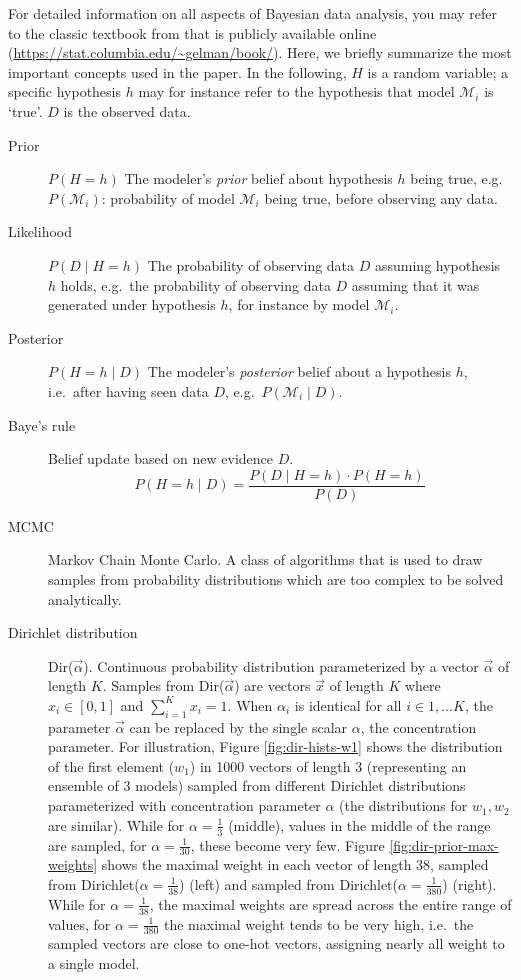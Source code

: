 For detailed information on all aspects of Bayesian data analysis, you may refer to the classic textbook from \citet{gelmanBayesianDataAnalysis2013} that is publicly available online (\url{https://stat.columbia.edu/~gelman/book/}).
Here, we briefly summarize the most important concepts used in the paper. In the following, $H$ is a random variable; a specific hypothesis $h$ may for instance refer to the hypothesis that model $\mathcal{M}_i$ is `true'. $D$ is the observed data.

\begin{description}
    \item[Prior] $P(H=h)$ The modeler's \emph{prior} belief about hypothesis $h$ being true, e.g.~$P(\mathcal{M}_i)$: probability of model $\mathcal{M}_i$ being true, before observing any data.
    \item[Likelihood] $P(D\mid H=h)$ The probability of observing data $D$ assuming hypothesis $h$ holds, e.g.~the probability of observing data $D$ assuming that it was generated under hypothesis $h$, for instance by model $\mathcal{M}_i$.
    \item[Posterior] $P(H=h \mid D)$ The modeler's \emph{posterior} belief about a hypothesis $h$, i.e.~after having seen data $D$, e.g.~$P(\mathcal{M}_i\mid D)$.
    \item[Baye's rule] Belief update based on new evidence $D$. \begin{equation}
P(H=h\mid D) = \frac{P(D\mid H=h) \cdot P(H=h)}{P(D)}
\end{equation}
    \item[MCMC] Markov Chain Monte Carlo. A class of algorithms that is used to draw samples from probability distributions which are too complex to be solved analytically.
    \item[Dirichlet distribution] Dir($\vec{\alpha}$). Continuous probability distribution parameterized by a vector $\vec{\alpha}$ of length $K$. Samples from  Dir($\vec{\alpha}$) are vectors $\vec{x}$ of length $K$ where $x_i \in [0,1]$ and $\sum_{i=1}^K x_i = 1$. When $\alpha_i$ is identical for all $i\in 1,\dots K$, the parameter $\vec{\alpha}$ can be replaced by the single scalar $\alpha$, the concentration parameter. For illustration, Figure \ref{fig:dir-hists-w1} shows the distribution of the first element ($w_1$) in 1000 vectors of length 3 (representing an ensemble of 3 models) sampled from different Dirichlet distributions parameterized with concentration parameter $\alpha$ (the distributions for $w_1,w_2$ are similar). While for $\alpha=\frac{1}{3}$ (middle), values in the middle of the range are sampled, for $\alpha=\frac{1}{30}$, these become very few. Figure \ref{fig:dir-prior-max-weights} shows the maximal weight in each vector of length 38, sampled from Dirichlet($\alpha=\frac{1}{38}$) (left) and sampled from Dirichlet($\alpha=\frac{1}{380}$) (right). While for $\alpha=\frac{1}{38}$, the maximal weights are spread across the entire range of values, for $\alpha=\frac{1}{380}$ the maximal weight tends to be very high, i.e.~the sampled vectors are close to one-hot vectors, assigning nearly all weight to a single model.
 

\end{description}
